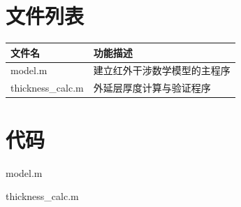 \documentclass[withoutpreface,bwprint]{cumcmthesis}
\begin{document}
\newpage
\begin{appendices}
\section{文件列表}
\begin{table}[H]
\centering
\begin{tabularx}{\textwidth}{LL}
\toprule
文件名   & 功能描述 \\
\midrule
model.m & 建立红外干涉数学模型的主程序 \\
thickness\_calc.m & 外延层厚度计算与验证程序 \\
\bottomrule
\end{tabularx}
\label{tab:文件列表}
\end{table}

\section{代码}
\noindent model.m

\noindent thickness\_calc.m

\end{appendices}
\end{document}
